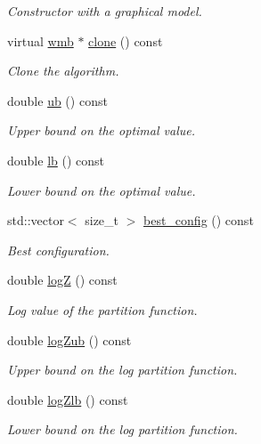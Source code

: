 \begin{DoxyCompactItemize}
\begin{DoxyCompactList}\small\item\em Constructor with a graphical model. \end{DoxyCompactList}\item 
virtual \hyperlink{classmerlin_1_1wmb}{wmb} $\ast$ \hyperlink{classmerlin_1_1wmb_a9a9120ce51df90d8c6fc60c01f308dd4}{clone} () const 
\begin{DoxyCompactList}\small\item\em Clone the algorithm. \end{DoxyCompactList}\item 
double \hyperlink{classmerlin_1_1wmb_a78d08bbf18835324d79a4f73eebeecc7}{ub} () const 
\begin{DoxyCompactList}\small\item\em Upper bound on the optimal value. \end{DoxyCompactList}\item 
double \hyperlink{classmerlin_1_1wmb_a88a812b53de1bde731d7d21305be6041}{lb} () const 
\begin{DoxyCompactList}\small\item\em Lower bound on the optimal value. \end{DoxyCompactList}\item 
std\+::vector$<$ size\+\_\+t $>$ \hyperlink{classmerlin_1_1wmb_ae2de6f3bc30e524b6e9190d02631af4f}{best\+\_\+config} () const 
\begin{DoxyCompactList}\small\item\em Best configuration. \end{DoxyCompactList}\item 
double \hyperlink{classmerlin_1_1wmb_aa2af3a4102ee07f954d24c44066f6a08}{logZ} () const 
\begin{DoxyCompactList}\small\item\em Log value of the partition function. \end{DoxyCompactList}\item 
double \hyperlink{classmerlin_1_1wmb_a91015e29caed663c30bb37cbd0609e24}{log\+Zub} () const 
\begin{DoxyCompactList}\small\item\em Upper bound on the log partition function. \end{DoxyCompactList}\item 
double \hyperlink{classmerlin_1_1wmb_affa03e963d632f43e2c5967cd3f7bff4}{log\+Zlb} () const 
\begin{DoxyCompactList}\small\item\em Lower bound on the log partition function. \end{DoxyCompactList}\item 

\end{DoxyCompactItemize}
